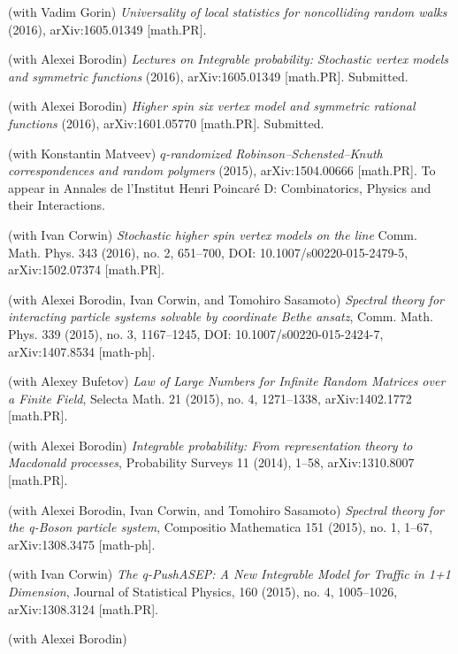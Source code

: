 \documentclass[letterpaper,11pt]{article}
\begin{document}
\begin{etaremune}
    \renewcommand{\labelenumi}{[\theenumi]}
    \item (with Vadim Gorin)
    \emph{Universality of local statistics for noncolliding random walks} (2016), arXiv:1605.01349 [math.PR].
    \item (with Alexei Borodin) 
    \emph{Lectures on Integrable probability: Stochastic vertex models and symmetric functions}
    (2016), arXiv:1605.01349 [math.PR]. Submitted.
    \item (with Alexei Borodin)
    \emph{Higher spin six vertex model and symmetric rational functions}
    (2016),
    arXiv:1601.05770 [math.PR]. Submitted.
    \item (with Konstantin Matveev)
    \emph{$q$-randomized Robinson--Schensted--Knuth correspondences and random polymers}
    (2015),
    arXiv:1504.00666 [math.PR]. 
    To appear in 
    Annales de l'Institut Henri Poincar\'e D:
    Combinatorics, Physics and their Interactions.
    \item (with Ivan Corwin)
    \emph{Stochastic higher spin vertex models on the line}
    Comm. Math. Phys. 
    343 (2016), no. 2, 
    651--700,
    DOI: 10.1007/s00220-015-2479-5,
    arXiv:1502.07374 [math.PR].
    \item (with Alexei Borodin, Ivan Corwin, and Tomohiro Sasamoto)
    \emph{Spectral theory for interacting particle systems solvable by coordinate Bethe ansatz}, 
    Comm. Math. Phys.
    339 (2015), no. 3, 
    1167--1245,
    DOI: 10.1007/s00220-015-2424-7,
    arXiv:1407.8534 [math-ph].
    \item (with Alexey Bufetov)
    \emph{Law of Large Numbers for Infinite Random Matrices over a Finite Field}, 
    Selecta Math. 21 (2015), no. 4, 
    1271--1338,
    arXiv:1402.1772 [math.PR].
    \item (with Alexei Borodin) 
    \emph{Integrable probability: From representation theory to Macdonald processes}, 
    Probability Surveys 11 (2014), 1--58, arXiv:1310.8007 [math.PR]. 
    \item (with Alexei Borodin, Ivan Corwin, and Tomohiro Sasamoto)
    \emph{Spectral theory for the q-Boson particle system},
    Compositio Mathematica 151 (2015), no. 1, 1--67,
    arXiv:1308.3475 [math-ph]. 
    \item (with Ivan Corwin)
    \emph{The q-PushASEP: A New Integrable Model for Traffic in 1+1 Dimension},
    Journal of Statistical Physics,
    160 (2015), no. 4, 1005--1026,
    arXiv:1308.3124 [math.PR].
    \item (with Alexei Borodin) 

\end{etaremune}
\end{document}
